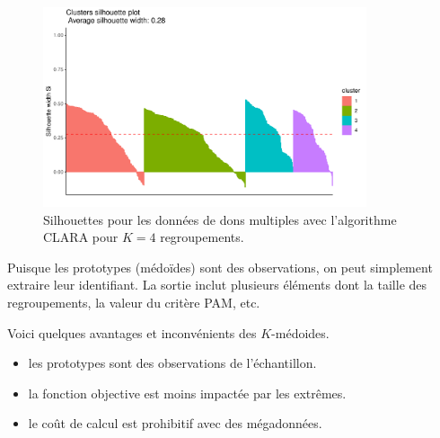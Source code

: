 \documentclass[
  11pt,
  letterpaper,
]{scrbook}
\newenvironment{Shaded}{\begin{snugshade}}{\end{snugshade}}
\newcommand{\CommentTok}[1]{\textcolor[rgb]{0.37,0.37,0.37}{#1}}
\newcommand{\DecValTok}[1]{\textcolor[rgb]{0.68,0.00,0.00}{#1}}
\newcommand{\NormalTok}[1]{\textcolor[rgb]{0.00,0.23,0.31}{#1}}
\newcommand{\OtherTok}[1]{\textcolor[rgb]{0.00,0.23,0.31}{#1}}
\newcommand{\SpecialCharTok}[1]{\textcolor[rgb]{0.37,0.37,0.37}{#1}}
\providecommand{\tightlist}{%
  \setlength{\itemsep}{0pt}\setlength{\parskip}{0pt}}\usepackage{longtable,booktabs,array}
\theoremstyle{definition}
\theoremstyle{remark}
\begin{document}
\begin{figure}[ht!]

{\centering \includegraphics[width=0.85\textwidth,height=\textheight]{regroupements_files/figure-pdf/fig-clarasilhouette-1.pdf}

}

\caption{\label{fig-clarasilhouette}Silhouettes pour les données de dons
multiples avec l'algorithme CLARA pour \(K=4\) regroupements.}

\end{figure}

Puisque les prototypes (médoïdes) sont des observations, on peut
simplement extraire leur identifiant. La sortie inclut plusieurs
éléments dont la taille des regroupements, la valeur du critère PAM,
etc.

\begin{Shaded}
\end{Shaded}

Voici quelques avantages et inconvénients des \(K\)-médoides.

\begin{itemize}
\tightlist
\item
  les prototypes sont des observations de l'échantillon.
\item
  la fonction objective est moins impactée par les extrêmes.
\item
  le coût de calcul est prohibitif avec des mégadonnées.
\end{itemize}
\end{document}
